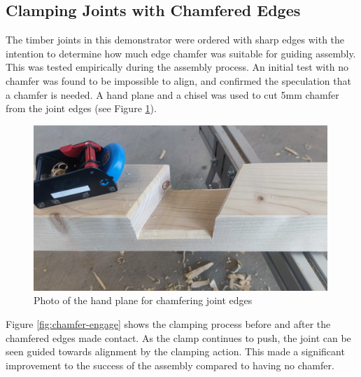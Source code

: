 \subsection{Clamping Joints with Chamfered Edges}
\label{subsection:exploration-2-clamping-joints-with-chamfered-edges}

The timber joints in this demonstrator were ordered with sharp edges with the intention to determine how much edge chamfer was suitable for guiding assembly. This was tested empirically during the assembly process. 
An initial test with no chamfer was found to be impossible to align, and confirmed the speculation that a chamfer is needed. A hand plane and a chisel was used to cut 5mm chamfer from the joint edges (see Figure \ref{fig:hand-plane}).

\begin{figure}
    \centering
    \includegraphics[width=0.99\textwidth]{images/05/image30.jpg}
    \caption{Photo of the hand plane for chamfering joint edges}
    \label{fig:hand-plane}
\end{figure}

Figure \ref{fig:chamfer-engage} shows the clamping process before and after the chamfered edges made contact. As the clamp continues to push, the joint can be seen guided towards alignment by the clamping action. This made a significant improvement to the success of the assembly compared to having no chamfer.

